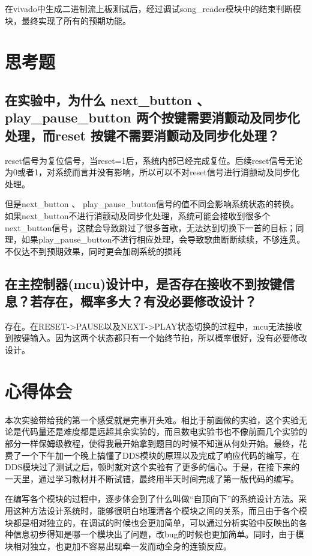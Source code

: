 \documentclass{../source/zjureport}
\begin{document}
    在vivado中生成二进制流上板测试后，经过调试song_reader模块中的结束判断模块，最终实现了所有的预期功能。

\section{思考题}
    \subsection{在实验中，为什么 next_button 、 play_pause_button 两个按键需要消颤动及同步化处理，而reset 按键不需要消颤动及同步化处理？}
    reset信号为复位信号，当reset=1后，系统内部已经完成复位。后续reset信号无论为0或者1，对系统而言并没有影响，所以可以不对reset信号进行消颤动及同步化处理。

    但是next_button 、 play_pause_button信号的值不同会影响系统状态的转换。如果next_button不进行消颤动及同步化处理，系统可能会接收到很多个next_button信号，这就会导致跳过了很多首歌，无法达到切换下一首的目标；同理，如果play_pause_button不进行相应处理，会导致歌曲断断续续，不够连贯。不仅达不到预期效果，同时更会加剧系统的损耗

    \subsection{在主控制器(mcu)设计中，是否存在接收不到按键信息？若存在，概率多大？有没必要修改设计？}
    存在。在RESET->PAUSE以及NEXT->PLAY状态切换的过程中，mcu无法接收到按键输入。因为这两个状态都只有一个始终节拍，所以概率很好，没有必要修改设计。

\section{心得体会}
本次实验带给我的第一个感受就是完事开头难。相比于前面做的实验，这个实验无论是代码量还是难度都是远超其余实验的，而且数电实验书也不像前面几个实验的部分一样保姆级教程，使得我最开始拿到题目的时候不知道从何处开始。最终，花费了一个下午加一个晚上搞懂了DDS模块的原理以及完成了响应代码的编写，在DDS模块过了测试之后，顿时就对这个实验有了更多的信心。于是，在接下来的一天里，通过学习教材并不断试错，最终用半天时间完成了第一版代码的编写。


在编写各个模块的过程中，逐步体会到了什么叫做“自顶向下”的系统设计方法。采用这种方法设计系统时，能够很明白地理清各个模块之间的关系，而且由于各个模块都是相对独立的，在调试的时候也会更加简单，可以通过分析实验中反映出的各种信息初步得知是哪一个模块出了问题，改bug的时候也更加简单。同时，由于模块相对独立，也更加不容易出现牵一发而动全身的连锁反应。
\end{document}

